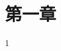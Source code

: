 \documentclass[supercite]{upcthesis}
\begin{document}
\fi

\section{第一章}

1





\ifx\compileAllFiles\undefined
\end{document}
